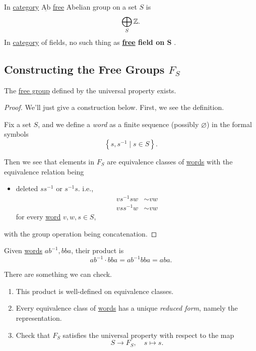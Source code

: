 \begin{eg}
	In \hyperref[def:category]{category} \(\underline{\mathrm{Ab}}\) \hyperref[def:free-group]{free} Abelian group on a set \(S\) is
	\[
		\bigoplus_S \mathbb{\MakeUppercase{z}}.
	\]
	In \hyperref[def:category]{category} of fields, no such thing as \textbf{\hyperref[def:free-group]{free} field on \(\bm{S} \) }.
\end{eg}

\subsection{Constructing the Free Groups \(F_S\)}
\begin{proposition}
	The \hyperref[def:free-group]{free group} defined by the universal property exists.
\end{proposition}
\begin{proof}
	We'll just give a construction below. First, we see the definition.
	\begin{definition}[Word]\label{def:word}
		Fix a set \(S\), and we define a \emph{word} as a finite sequence (possibly \(\varnothing \))
		in the formal symbols
		\[
			\left\{s, s ^{-1} \mid s\in S\right\}.
		\]
	\end{definition}

	Then we see that elements in \(F_S\) are equivalence classes of \hyperref[def:word]{words} with the equivalence relation being
	\begin{itemize}
		\item deleted \(s s ^{-1} \) or \(s ^{-1} s\). i.e.,
		      \[
			      \begin{split}
				      vs ^{-1} s w&\sim vw\\
				      v s s ^{-1}  w &\sim vw
			      \end{split}
		      \]
		      for every \hyperref[def:word]{word} \(v, w, s\in S\),
	\end{itemize}
	with the group operation being concatenation.
\end{proof}

\begin{eg}
	Given \hyperref[def:word]{words} \(ab^{-1} , bba\), their product is
	\[
		ab^{-1} \cdot bba = ab^{-1}  bb a = aba.
	\]
\end{eg}

\begin{exercise}
	There are something we can check.
	\begin{enumerate}
		\item This product is well-defined on equivalence classes.
		\item Every equivalence class of \hyperref[def:word]{words} has a unique \emph{reduced form}, namely the representation.
		\item Check that \(F_S\) satisfies the universal property with respect to the map
		      \[
			      S\to F_S,\quad s\mapsto s.
		      \]
	\end{enumerate}
\end{exercise}

